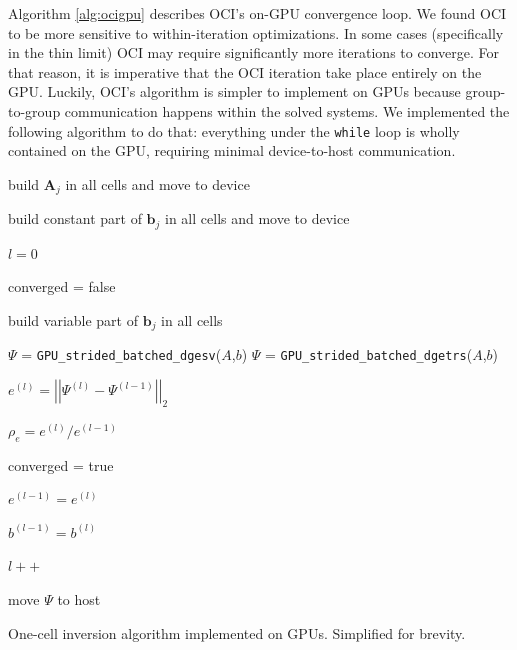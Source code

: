 Algorithm \ref{alg:ocigpu} describes OCI's on-GPU convergence loop.
We found OCI to be more sensitive to within-iteration optimizations.
In some cases (specifically in the thin limit) OCI may require significantly more iterations to converge.
For that reason, it is imperative that the OCI iteration take place entirely on the GPU.
Luckily, OCI's algorithm is simpler to implement on GPUs because group-to-group communication happens within the solved systems.
We implemented the following algorithm to do that: everything under the \texttt{while} loop is wholly contained on the GPU, requiring minimal device-to-host communication.

\begin{algorithm}
\begin{algorithmic}[1]
    \State build $\bm{A}_j$ in all cells and move to device 

    \State build constant part of $\bm{b}_j$ in all cells and move to device 

    \State $l = 0$ 

    \State converged = false

        
        \State build variable part of $\bm{b}_j$ in all cells 

            \State $\Psi$ = \texttt{GPU\_strided\_batched\_dgesv}($A$,$b$)
        \Else
            \State $\Psi$ = \texttt{GPU\_strided\_batched\_dgetrs}($A$,$b$) 
        \EndIf

        \State $e^{(l)}=\left|\left|\Psi^{(l)} - \Psi^{(l-1)}\right|\right|_2$ 

        \State $\rho_e = e^{(l)} / e^{(l-1)}$ 

         
            \State converged = true
        \EndIf

        \State $e^{(l-1)} = e^{(l)}$

        \State $b^{(l-1)} = b^{(l)}$

        \State $l++$
            
    \EndWhile
    
    \State move $\Psi$ to host
    \caption{One-cell inversion algorithm implemented on GPUs. Simplified for brevity.}
    \label{alg:ocigpu}
\end{algorithmic}
\end{algorithm}

